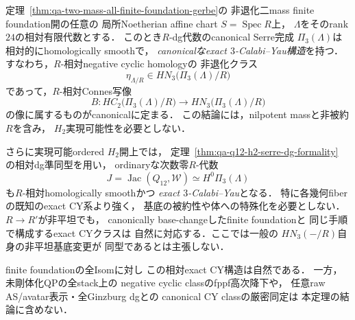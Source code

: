 \begin{theorem}
\label{thm:qa-q12-relative-exact-three-cy}
定理~\ref{thm:qa-two-mass-all-finite-foundation-gerbe}の
非退化二mass finite foundation開の任意の
局所Noetherian affine chart $S=\operatorname{Spec}R$上，
$\Lambda$をそのrank $24$の相対有限代数とする．
このとき$R$-dg代数のcanonical Serre完成
$\Pi_3(\Lambda)$は相対的にhomologically smoothで，
\emph{canonicalなexact $3$-Calabi--Yau構造}を持つ．
すなわち，$R$-相対negative cyclic homologyの
非退化クラス
\[
 \eta_{\Lambda/R}\in
 HN_3\bigl(\Pi_3(\Lambda)/R\bigr)
\]
であって，$R$-相対Connes写像
\[
 B:HC_2\bigl(\Pi_3(\Lambda)/R\bigr)
       \longrightarrow
 HN_3\bigl(\Pi_3(\Lambda)/R\bigr)
\]
の像に属するものがcanonicalに定まる．
この結論には，nilpotent massと非被約$R$を含み，
$H_2$実現可能性を必要としない．

さらに実現可能ordered $H_2$開上では，
定理~\ref{thm:qa-q12-h2-serre-dg-formality}
の相対dg準同型を用い，
ordinaryな次数零$R$-代数
\[
 J=\operatorname{Jac}(Q_{12},\mathcal W)
 \simeq H^0\Pi_3(\Lambda)
\]
も$R$-相対homologically smoothかつ
\emph{exact $3$-Calabi--Yau}となる．
特に各幾何fiberの既知のexact CY系より強く，
基底の被約性や体への特殊化を必要としない．
$R\to R'$が非平坦でも，
canonically base-changeしたfinite foundationと
同じ手順で構成するexact CYクラスは
自然に対応する．ここでは一般の
$HN_3(-/R)$自身の非平坦基底変更が
同型であるとは主張しない．

finite foundationの全Isomに対し
この相対exact CY構造は自然である．
一方，未剛体化QPの全stack上の
negative cyclic classのfppf高次降下や，
任意raw AS/avatar表示・全Ginzburg dgとの
canonical CY classの厳密同定は
本定理の結論に含めない．
\end{theorem}

